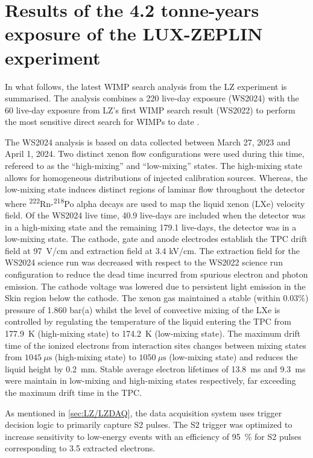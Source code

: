 \chapter{Results of the 4.2 tonne-years exposure of the LUX-ZEPLIN experiment}
In what follows, the latest WIMP search analysis from the LZ experiment is summarised. The analysis combines a 220 live-day exposure (WS2024) with the 60 live-day exposure from LZ's first WIMP search result (WS2022) \cite{LZ:2022lsv} to perform the most sensitive direct search for WIMPs to date \cite{LZCollaboration:2024lux}.

The WS2024 analysis is based on data collected between March 27, 2023 and April 1, 2024. Two distinct xenon flow configurations were used during this time, refereed to as the ``high-mixing'' and ``low-mixing'' states. The high-mixing state allows for homogeneous distributions of injected calibration sources. Whereas, the low-mixing state induces distinct regions of laminar flow throughout the detector where \textsuperscript{222}Rn-\textsuperscript{218}Po alpha decays are used to map the liquid xenon (LXe) velocity field. Of the WS2024 live time, 40.9 live-days are included when the detector was in a high-mixing state and the remaining 179.1 live-days, the detector was in a low-mixing state. The cathode, gate and anode electrodes establish the TPC drift field at 97~V/cm and extraction field at 3.4 kV/cm. The extraction field for the WS2024 science run was decreased with respect to the WS2022 science run configuration to reduce the dead time incurred from spurious electron and photon emission. The cathode voltage was lowered due to persistent light emission in the Skin region below the cathode.
The xenon gas maintained a stable (within 0.03\%) pressure of 1.860 bar(a) whilst the level of convective mixing of the LXe is controlled by regulating the temperature of the liquid entering the TPC from 177.9~K (high-mixing state) to 174.2~K (low-mixing state). The maximum drift time of the ionized electrons from interaction sites changes between mixing states from $1045~\mu\text{s}$ (high-mixing state) to $1050~\mu\text{s}$ (low-mixing state) and reduces the liquid height by 0.2~mm. Stable average electron lifetimes of 13.8~ms and 9.3~ms were maintain in low-mixing and high-mixing states respectively, far exceeding the maximum drift time in the TPC.

As mentioned in \autoref{sec:LZ/LZDAQ}, the data acquisition system uses trigger decision logic to primarily capture S2 pulses. The S2 trigger was optimized to increase sensitivity to low-energy events with an efficiency of 95~\% for S2 pulses corresponding to 3.5 extracted electrons.

